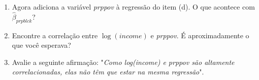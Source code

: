 \documentclass[12pt,letterpaper, onecolumn]{exam}
\begin{document}
\begin{questions}
\begin{enumerate} [label = (\alph*)]
\begin{equation*}
    \log(psoda) = \beta_0 + \beta_1prpblck + \beta_2\log(income) + u
\end{equation*} Se \textit{prpblck} aumenta $0,22$ (20 pontos percentuais), qual é a alteração percentual estimada em \textit{psoda}? [\textit{Dica}: A resposta é 2.xx, você deve encontrar o "xx".]
\item Agora adiciona a variável \textit{prppov} à regressão do item (d). O que acontece com $\hat\beta_{prpblck}$?
\item Encontre a correlação entre $\log(income)$ e \textit{prppov}. É aproximadamente o que você esperava?
\item Avalie a seguinte afirmação: "\textit{Como log(income) e prppov são altamente correlacionadas, elas não têm que estar na mesma regressão}".
    \end{enumerate}
    
\end{questions}
\newpage

\end{document}
